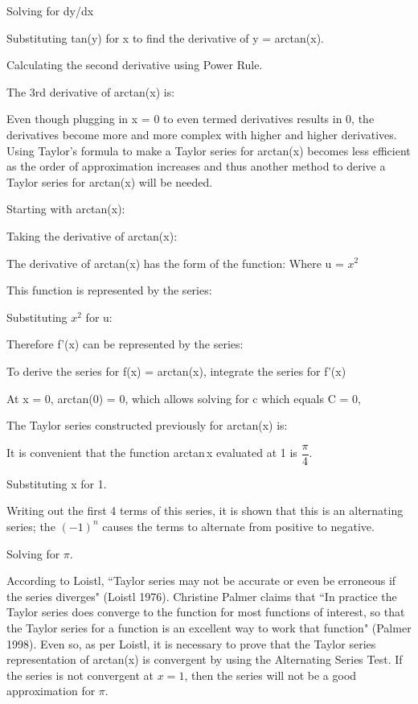 Solving for dy/dx

Substituting tan(y) for x to find the derivative of y = arctan(x).

Calculating the second derivative using Power Rule.

The 3rd derivative of arctan(x) is:

Even though plugging in x = 0 to even termed derivatives results in 0, the derivatives become more and more complex with higher and higher derivatives. Using Taylor's formula to make a Taylor series for arctan(x) becomes less efficient as the order of approximation increases and thus another method to derive a Taylor series for arctan(x) will be needed.

Starting with arctan(x):

Taking the derivative of arctan(x):

The derivative of arctan(x) has the form of the function:
Where u = \(x^2\)

This function is represented by the series:

Substituting \(x^{2}\) for u: 

Therefore f'(x) can be represented by the series:

To derive the series for f(x) = arctan(x), integrate the series for f'(x)

At x = 0, arctan(0) = 0, which allows solving for c which equals C = 0,

The Taylor series constructed previously for arctan(x) is:

It is convenient that the function arctan\,x evaluated at 1 is \(\dfrac{\pi}{4}\).

Substituting x for 1.

Writing out the first 4 terms of this series, it is shown that this is an alternating series; the \((-1)^{n}\) causes the terms to alternate from positive to negative.

Solving for \(\pi\).

According to Loistl, ``Taylor series may not be accurate or even be erroneous if the series diverges" (Loistl 1976). Christine Palmer claims that ``In practice the Taylor series does converge to the function for most functions of interest, so that the Taylor series for a function is an excellent way to work that function" (Palmer 1998). Even so, as per Loistl, it is necessary to prove that the Taylor series representation of arctan(x) is convergent by using the Alternating Series Test. If the series is not convergent at \(x = 1\), then the series will not be a good approximation for \(\pi\).

